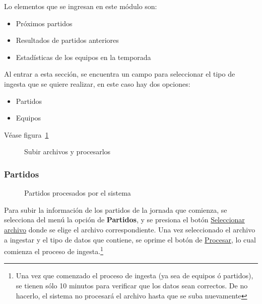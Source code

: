Lo elementos que se ingresan en este módulo son:

\begin{itemize}
\item Próximos partidos
\item Resultados de partidos anteriores
\item Estadísticas de los equipos en la temporada
\end{itemize}

Al entrar a esta sección, se encuentra un campo para seleccionar el tipo de ingesta que se quiere realizar, en este caso hay dos opciones:

\begin{itemize}
\item Partidos  
\item Equipos
\end{itemize}
Véase figura~\ref{Fig:ingesta}

\begin{figure}[!htb]\centering
   \begin {minipage}{0.8\textwidth}
     \caption[Subir y procesar archivos]{Subir archivos y procesarlos\footnotemark}
	 \label{Fig:ingesta}
   \end{minipage}
\end{figure}




\subsubsection{Partidos}
\begin{figure}[!htb]\centering
   \begin {minipage}{1\textwidth}
     \caption{Partidos procesados por el sistema}
	 \label{Fig:partidos}
   \end{minipage}
\end{figure}

Para subir la información de los partidos de la jornada que comienza, se selecciona del menú la opción de \textbf{Partidos}, y se presiona el botón \underline{Seleccionar archivo} donde se elige el archivo correspondiente.
Una vez seleccionado el archivo a ingestar y el tipo de datos que contiene, se oprime el botón de \underline{Procesar}, lo cual comienza el proceso de ingesta.\footnote{Una vez que comenzado el proceso de ingesta (ya sea de equipos ó partidos), se tienen sólo 10 minutos para verificar que los datos sean correctos. De no hacerlo, el sistema no procesará el archivo hasta que se suba nuevamente}


